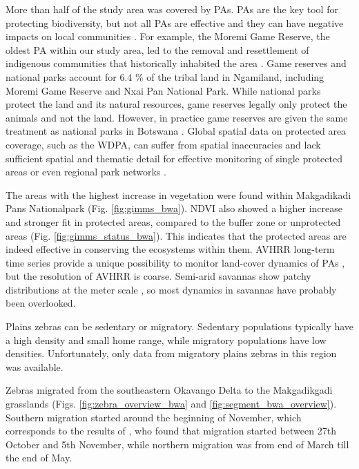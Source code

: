 \documentclass[12pt,a4paper, twoside, english]{article}
\begin{document}

More than half of the study area was covered by PAs. PAs are the key tool for protecting biodiversity, but not all PAs are effective and they can have negative impacts on local communities \citep{Oldekop2015}. For example, the Moremi Game Reserve, the oldest PA within our study area, led to the removal and resettlement of indigenous communities that historically inhabited the area \citep{Kgathi2014}. Game reserves and national parks account for 6.4 \% of the tribal land in Ngamiland, including Moremi Game Reserve and Nxai Pan National Park. While national parks protect the land and its natural resources, game reserves legally only protect the animals and not the land. However, in practice game reserves are given the same treatment as national parks in Botswana \citep{Kgathi2014}. Global spatial data on protected area coverage, such as the WDPA, can suffer from spatial inaccuracies and lack sufficient spatial and thematic detail for effective monitoring of single protected areas or even regional park networks \citep{Chape2005, Nagendra2013}. 

The areas with the highest increase in vegetation were found within Makgadikadi Pans Nationalpark (Fig. \ref{fig:gimms_bwa}). NDVI also showed a higher increase and stronger fit in protected areas, compared to the buffer zone or unprotected areas (Fig. \ref{fig:gimms_status_bwa}). This indicates that the protected areas are indeed effective in conserving the ecosystems within them. AVHRR long-term time series provide a unique possibility to monitor land-cover dynamics of PAs \citep{Wegmann2014}, but the resolution of AVHRR is coarse. Semi-arid savannas show patchy distributions at the meter scale \citep{Kgathi2014}, so most dynamics in savannas have probably been overlooked.


Plains zebras can be sedentary or migratory. Sedentary populations typically have a high density and small home range, while migratory populations have low densities. Unfortunately, only data from migratory plains zebras in this region was available.

Zebras migrated from the southeastern Okavango Delta to the Makgadikgadi grasslands (Figs. \ref{fig:zebra_overview_bwa} and \ref{fig:segment_bwa_overview}). Southern migration started around the beginning of November, which corresponds to the results of \cite{Bartlam-Brooks2013}, who found that migration started between 27th October and 5th November, while northern migration was from end of March till the end of May. 
\end{document}
